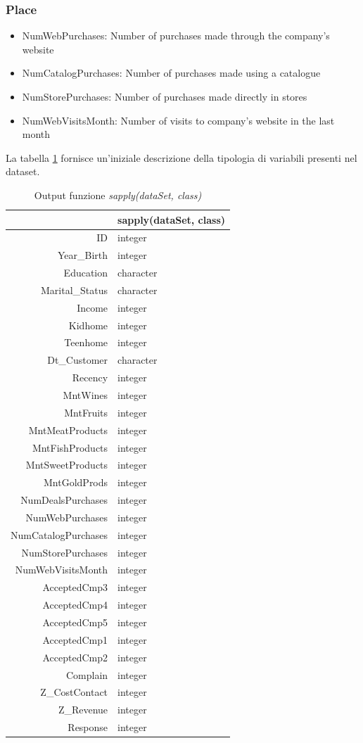 \documentclass[letterpaper,11pt]{article}
\begin{document}
\subsubsection*{Place}
\begin{itemize}
\item NumWebPurchases: Number of purchases made through the company’s website
\item NumCatalogPurchases: Number of purchases made using a catalogue
\item NumStorePurchases: Number of purchases made directly in stores
\item NumWebVisitsMonth: Number of visits to company’s website in the last month
\end{itemize}
La tabella \ref{fig:sapply(dataSet, class)} fornisce un'iniziale descrizione della tipologia di variabili presenti nel dataset. \\
\begin{table}[H]
\centering
\begin{tabular}{rl}
  \hline
 & sapply(dataSet, class) \\ 
  \hline
ID & integer \\ 
  Year\_Birth & integer \\ 
  Education & character \\ 
  Marital\_Status & character \\ 
  Income & integer \\ 
  Kidhome & integer \\ 
  Teenhome & integer \\ 
  Dt\_Customer & character \\ 
  Recency & integer \\ 
  MntWines & integer \\ 
  MntFruits & integer \\ 
  MntMeatProducts & integer \\ 
  MntFishProducts & integer \\ 
  MntSweetProducts & integer \\ 
  MntGoldProds & integer \\ 
  NumDealsPurchases & integer \\ 
  NumWebPurchases & integer \\ 
  NumCatalogPurchases & integer \\ 
  NumStorePurchases & integer \\ 
  NumWebVisitsMonth & integer \\ 
  AcceptedCmp3 & integer \\ 
  AcceptedCmp4 & integer \\ 
  AcceptedCmp5 & integer \\ 
  AcceptedCmp1 & integer \\ 
  AcceptedCmp2 & integer \\ 
  Complain & integer \\ 
  Z\_CostContact & integer \\ 
  Z\_Revenue & integer \\ 
  Response & integer \\ 
   \hline
\end{tabular}
\caption{Output funzione \textit{sapply(dataSet, class)}}
\label{fig:sapply(dataSet, class)}
\end{table}
\end{document}
